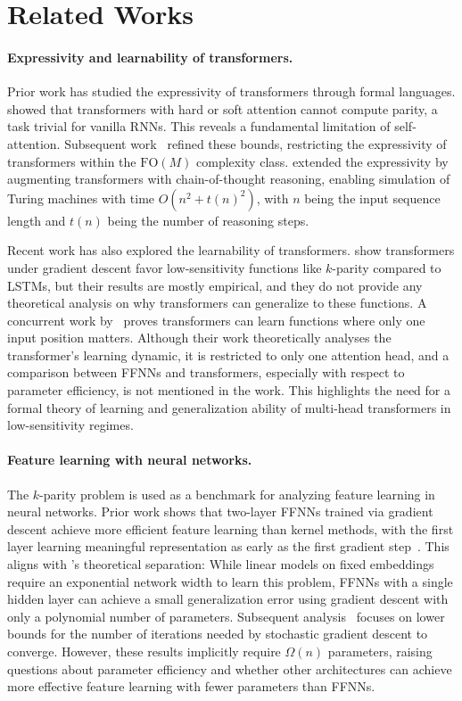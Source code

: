 \section{Related Works}
\paragraph{Expressivity and learnability of transformers.}
Prior work has studied the expressivity of transformers through formal languages. \citet{self_attention_limit} showed that transformers with hard or soft attention cannot compute parity, a task trivial for vanilla RNNs. This reveals a fundamental limitation of self-attention. Subsequent work~\citep{circuit, log-precision_trans, power_hard_attn} refined these bounds, restricting the expressivity of transformers within the $\text{FO}(M)$ complexity class. \citet{cot_express} extended the expressivity by augmenting transformers with chain-of-thought reasoning, enabling simulation of Turing machines with time $O(n^2 + t(n)^2)$, with $n$ being the input sequence length and $t(n)$ being the number of reasoning steps.

Recent work has also explored the learnability of transformers. 
\citet{simplicity_bias} show transformers under gradient descent favor low-sensitivity functions like $k$-parity compared to LSTMs, but their results are mostly empirical, and they do not provide any theoretical analysis on why transformers can generalize to these functions. A concurrent work by~\citet{single-location-attention} proves transformers can learn functions where only one input position matters. Although their work theoretically analyses the transformer's learning dynamic, it is restricted to only one attention head, and a comparison between FFNNs and transformers, especially with respect to parameter efficiency, is not mentioned in the work. This highlights the need for a formal theory of learning and generalization ability of multi-head transformers in low-sensitivity regimes.

\paragraph{Feature learning with neural networks.}
The $k$-parity problem is used as a benchmark for analyzing feature learning in neural networks. Prior work shows that two-layer FFNNs trained via gradient descent achieve more efficient feature learning than kernel methods, with the first layer learning meaningful representation as early as the first gradient step~\citep{feature_learning_2, feature_learning_1}. This aligns with \citet{LPNN}'s theoretical separation: While linear models on fixed embeddings require an exponential network width to learn this problem, FFNNs with a single hidden layer can achieve a small generalization error using gradient descent with only a polynomial number of parameters. Subsequent analysis~\citep{SQlower} focuses on lower bounds for the number of iterations needed by stochastic gradient descent to converge.
%
However, these results implicitly require $\Omega(n)$ parameters, raising questions about parameter efficiency and whether other architectures can achieve more effective feature learning with fewer parameters than FFNNs.